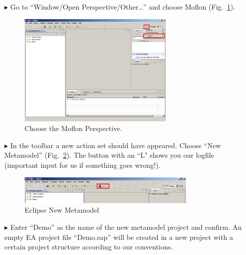 \begin{enumerate}
\item[$\blacktriangleright$] Go to ``Window/Open Perspective/Other\ldots'' and
choose Moflon (Fig.~\ref{fig_eclipse}).
\begin{figure}[!h]
	\centering
  \includegraphics[width=0.7\textwidth]{pics/eclipse_firststart.png}
	\caption{Choose the Moflon Perspective.}
	\label{fig_eclipse}
\end{figure}

\item[$\blacktriangleright$] In the toolbar a new action set should have
appeared. Choose ``New Metamodel'' (Fig.~\ref{fig_eclipseNewMetamodel}).
The button with an ``L" shows you our logfile (important input for us if
something goes wrong!).
\begin{figure}[!h]
	\centering
  \includegraphics[width=0.8\textwidth]{pics/eclipse_metamodelButton.png}
	\caption{Eclipse New Metamodel}
	\label{fig_eclipseNewMetamodel}
\end{figure}

\item[$\blacktriangleright$] Enter ``Demo'' as the name of the new metamodel
project and confirm. 
An empty EA project file ``Demo.eap'' will be
created in a new project with a certain project structure
according to our conventions.

\newpage


\end{enumerate}
